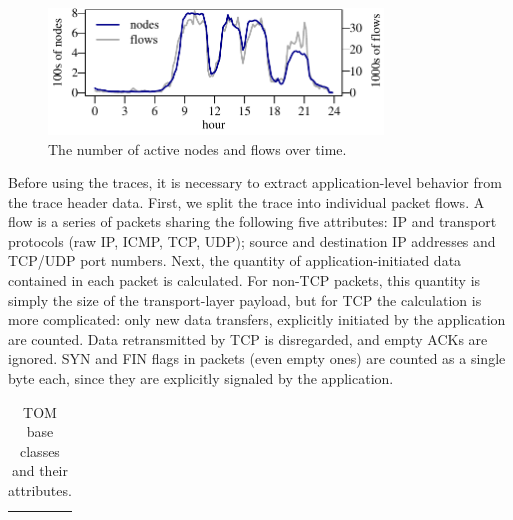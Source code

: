 \documentclass[conference]{IEEEtran}
\newcommand{\caps}[1]{{\small{#1}}}
\begin{document}
\begin{figure}
\vspace{0.45em}
\begin{center}
\includegraphics[width=3.5in]{nodes-flows}%
\vspace{-0.75em}%
\caption{The number of active nodes and flows over time.} 
\label{fig:nodes-flows}
\end{center}
\vspace{-2em}
\end{figure}

Before using the traces, it is necessary to extract application-level behavior from the trace header data. First, we split the trace into individual packet flows. A flow is a series of packets sharing the following five attributes: \caps{IP} and transport protocols (raw \caps{IP}, \caps{ICMP}, \caps{TCP}, \caps{UDP}); source and destination \caps{IP} addresses and \caps{TCP}/\caps{UDP} port numbers. Next, the quantity of application-initiated data contained in each packet is calculated. For non-\caps{TCP} packets, this quantity is simply the size of the transport-layer payload, but for \caps{TCP} the calculation is more complicated: only new data transfers, explicitly initiated by the application are counted. Data retransmitted by \caps{TCP} is disregarded, and empty \caps{ACK}s are ignored. \caps{SYN} and \caps{FIN} flags in packets (even empty ones) are counted as a single byte each, since they are explicitly signaled by the application. %

\begin{table}[t]
\vspace{0.75em}
\begin{center}
\begin{tabular}[t]{|l|}
\hline
\begin{minipage}[l]{2.7in}
\begin{small}
\vspace{0.7em}

\end{small}
\end{minipage}
\\\hline
\end{tabular}
\end{center}
\vspace{-0.5em}
\caption{{\footnotesize{TOM}} base classes and their attributes.}
\label{tab:properties}
\vspace{-2em}
\end{table}
\end{document}

